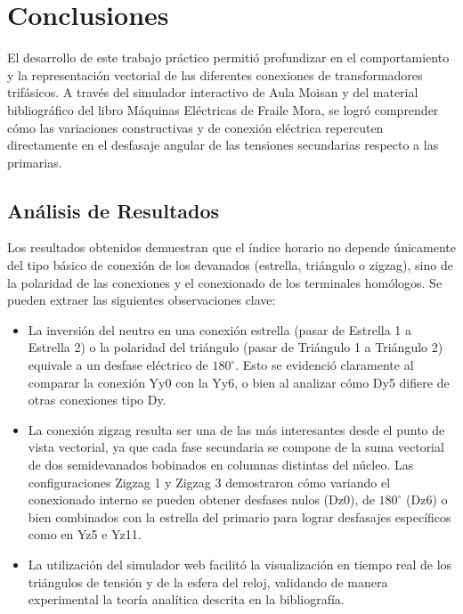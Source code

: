 \chapter{Conclusiones}

El desarrollo de este trabajo práctico permitió profundizar en el comportamiento y la representación vectorial de las
diferentes conexiones de transformadores trifásicos. A través del simulador interactivo de Aula Moisan y del material
bibliográfico del libro Máquinas Eléctricas de Fraile Mora, se logró comprender cómo las variaciones constructivas y
de conexión eléctrica repercuten directamente en el desfasaje angular de las tensiones secundarias respecto a las primarias.

\section{Análisis de Resultados}
Los resultados obtenidos demuestran que el índice horario no depende únicamente del tipo básico de conexión de los devanados
(estrella, triángulo o zigzag), sino de la polaridad de las conexiones y el conexionado de los terminales homólogos. Se
pueden extraer las siguientes observaciones clave:
\begin{itemize}
    \item La inversión del neutro en una conexión estrella (pasar de Estrella 1 a Estrella 2) o la polaridad del triángulo
    (pasar de Triángulo 1 a Triángulo 2) equivale a un desfase eléctrico de $180^\circ$. Esto se evidenció claramente
    al comparar la conexión Yy0 con la Yy6, o bien al analizar cómo Dy5 difiere de otras conexiones tipo Dy.
    \item La conexión zigzag resulta ser una de las más interesantes desde el punto de vista vectorial, ya que cada fase
    secundaria se compone de la suma vectorial de dos semidevanados bobinados en columnas distintas del núcleo. Las
    configuraciones Zigzag 1 y Zigzag 3 demostraron cómo variando el conexionado interno se pueden obtener desfases
    nulos (Dz0), de $180^\circ$ (Dz6) o bien combinados con la estrella del primario para lograr desfasajes específicos
    como en Yz5 e Yz11.
    \item La utilización del simulador web facilitó la visualización en tiempo real de los triángulos de tensión y de la
    esfera del reloj, validando de manera experimental la teoría analítica descrita en la bibliografía.
\end{itemize}

